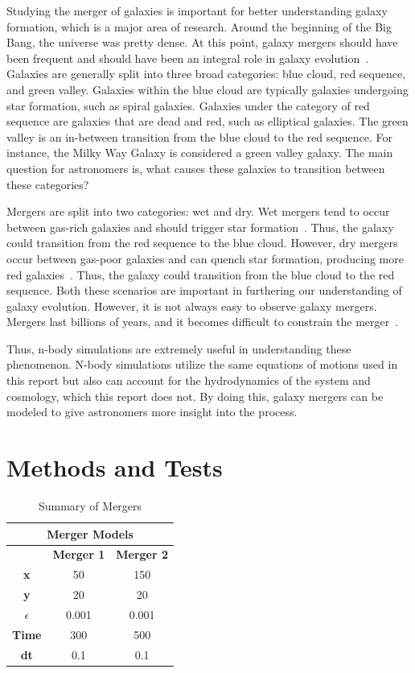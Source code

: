 \documentclass[12pt]{report}
\begin{document}
Studying the merger of galaxies is important for better understanding galaxy formation, which is a major area of research. Around the beginning of the Big Bang, the universe was pretty dense. At this point, galaxy mergers should have been frequent and should have been an integral role in galaxy evolution~\citep{mergers}. Galaxies are generally split into three broad categories: blue cloud, red sequence, and green valley. Galaxies within the blue cloud are typically galaxies undergoing star formation, such as spiral galaxies. Galaxies under the category of red sequence are galaxies that are dead and red, such as elliptical galaxies. The green valley is an in-between transition from the blue cloud to the red sequence. For instance, the Milky Way Galaxy is considered a green valley galaxy. The main question for astronomers is, what causes these galaxies to transition between these categories?

Mergers are split into two categories: wet and dry. Wet mergers tend to occur between gas-rich galaxies and should trigger star formation~\citep{2008ApJ}. Thus, the galaxy could transition from the red sequence to the blue cloud. However, dry mergers occur between gas-poor galaxies and can quench star formation, producing more red galaxies~\citep{2008ApJ}. Thus, the galaxy could transition from the blue cloud to the red sequence. Both these scenarios are important in furthering our understanding of galaxy evolution. However, it is not always easy to observe galaxy mergers. Mergers last billions of years, and it becomes difficult to constrain the merger~\citep{2008MNRAS}. 

Thus, n-body simulations are extremely useful in understanding these phenomenon. N-body simulations utilize the same equations of motions used in this report but also can account for the hydrodynamics of the system and cosmology, which this report does not. By doing this, galaxy mergers can be modeled to give astronomers more insight into the process.


\section*{Methods and Tests}

\begin{table}[H] \centering
\begin{tabular}{@{}ccc@{}} 
\toprule
\multicolumn{3}{c}{\textbf{Merger Models}} \\ \midrule
\multicolumn{1}{c|}{} & \textbf{Merger 1} & \textbf{Merger 2} \\ \cmidrule(l){2-3} 
\multicolumn{1}{c|}{\textbf{x}} & 50 & 150 \\
\multicolumn{1}{c|}{\textbf{y}} & 20 & 20 \\
\multicolumn{1}{c|}{\textbf{$\epsilon$}} & 0.001 & 0.001 \\
\multicolumn{1}{c|}{\textbf{Time}} & 300 & 500 \\
\multicolumn{1}{c|}{\textbf{dt}} & 0.1 & 0.1 \\ \bottomrule
\end{tabular}
\caption{Summary of Mergers}
\label{tab:Models}
\end{table}
\end{document}
